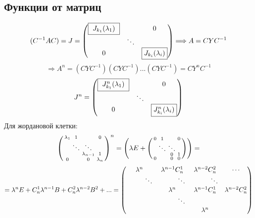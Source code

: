     \subsection{Функции от матриц}
    $$(C^{-1}AC) = J = \begin{pmatrix}
        \text{\fbox{ $J_{k_1}(\lambda_1)$ }} & \null & 0\\
        \null & \ddots \\
        0 & \null & \text{\fbox{$J_{k_i}(\lambda_i)$}}
    \end{pmatrix} \Longrightarrow A = CYC^{-1}$$ 
    $$\Longrightarrow A^n = (CYC^{-1})(CYC^{-1})...(CYC^{-1}) = CY^nC^{-1}$$
    $$J^n = \begin{pmatrix}
        \text{\fbox{ $J_{k_1}^n(\lambda_1)$ }} & \null & 0\\
        \null & \ddots \\
        0 & \null & \text{\fbox{$J_{k_i}^n(\lambda_i)$}}
    \end{pmatrix}$$
    Для жордановой клетки: 
    $$\left(\begin{smallmatrix}
        \lambda_1 & 1 & \null & 0 \\
        \null & \ddots & \ddots & \null \\
        \null & \null & \lambda_{n-1} & 1 \\
        0 & \null & 0 & \lambda_n 
    \end{smallmatrix}\right)^n = \left(\lambda E + \left(\begin{smallmatrix}
        0 & 1 & \null & 0 \\
        \null & \ddots & \ddots & \null \\
        \null & \null & 0 & 1 \\
        0 & \null & 0 & 0 
    \end{smallmatrix}\right)\right) =$$ 
    $$= \lambda^n E + C_n^1 \lambda^{n-1}B + C_n^2 \lambda^{n-2}B^2 + ... = \begin{pmatrix}
        \lambda^n & \lambda^{n-1}C_n^1 & \lambda^{n-2}C_n^2 & \cdots\\
        \tab[1cm] \ddots & \tab[1cm] \ddots & \tab[1cm] \ddots \\
        \null & \lambda^n & \lambda^{n-1}C_n^1 & \lambda^{n-2}C_n^2\\
        \tab[1cm] \null & \tab[1cm] \ddots \\
        \null & \null & \lambda^n 
    \end{pmatrix}$$
